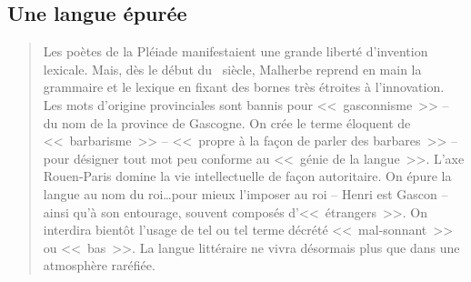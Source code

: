 \subsection{Une langue épurée}\label{langpur}

\begin{quotation}
  Les poètes de la Pléiade manifestaient une grande liberté
  d'invention lexicale.
  Mais, dès le début du \textsc{}~siècle,
  Malherbe reprend en main la grammaire et le lexique en fixant des
  bornes très étroites à l'innovation.
  Les mots d'origine provinciales sont bannis pour <<~gasconnisme~>>
  -- du nom de la province de Gascogne. On crée le terme éloquent de
  <<~barbarisme~>> -- <<~propre à la façon de parler des barbares~>>
  -- pour désigner tout mot peu conforme au <<~génie de la
  langue~>>. L'axe Rouen-Paris domine la vie intellectuelle de façon
  autoritaire. On épure la langue au nom du roi\dots pour mieux
  l'imposer au roi -- Henri \textsc{} est Gascon --
  ainsi qu'à son entourage, souvent composés d'<<~étrangers~>>. On
  interdira bientôt l'usage de tel ou tel terme décrété
  <<~mal-sonnant~>> ou <<~bas~>>. La langue littéraire ne vivra
  désormais plus que dans une atmosphère raréfiée.
\end{quotation}

\newpage
\minitoc
